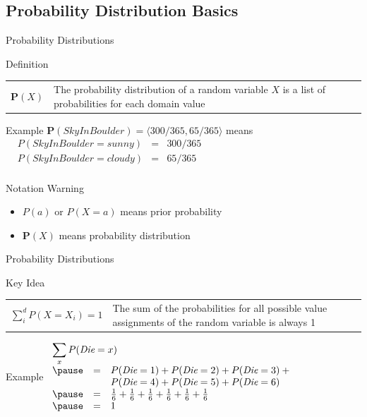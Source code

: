 \documentclass[14pt]{beamer}
\begin{document}
\subsection{Probability Distribution Basics}
\begin{frame}{Probability Distributions}
	\begin{block}{Definition}
		\begin{tabular}{lm{3.5in}@{}}
			\large $\mathbf{P}(X)$
			&
			The \alert{probability distribution} of a random variable $X$ is a list of probabilities for each domain value
		\end{tabular}
	\end{block}
	\pause
	\begin{block}{Example}
		$\mathbf{P}(\textit{SkyInBoulder}) = \langle 300/365, 65/365 \rangle$ means \\[.25em]
		$
		\begin{array}{llll}
			& P(\textit{SkyInBoulder}=\textit{sunny})  & = & 300/365 \\
			& P(\textit{SkyInBoulder}=\textit{cloudy}) & = & 65/365 \\
		\end{array}
		$
	\end{block}
	\pause
	\begin{block}{Notation Warning}
		\begin{itemize}
			\item $P(a)$ or $P(X=a)$ means prior probability
			\item $\mathbf{P}(X)$ means probability distribution
		\end{itemize}
	\end{block}
\end{frame}
\begin{frame}{Probability Distributions}
	\begin{block}{Key Idea}
		\begin{tabular}{lm{2.4in}@{}}
			\large $\sum\limits^{d}_{i}{P(X=X_{i})} = 1$
			&
			The sum of the probabilities for all possible value assignments of the random variable is always 1
		\end{tabular}
	\end{block}
	\pause
	\begin{block}{Example}
		$
		\begin{array}{lll}
			\lefteqn{\sum\limits_{x}{P(\textit{Die}=x)}} \\
			\pause
			& = & P(\textit{Die}=1) + P(\textit{Die}=2) + P(\textit{Die}=3) + \mbox{}\\
			&   & P(\textit{Die}=4) + P(\textit{Die}=5) + P(\textit{Die}=6) \\
			\pause
			& = & \frac{1}{6} + \frac{1}{6} + \frac{1}{6} + \frac{1}{6} + \frac{1}{6} + \frac{1}{6} \\
			\pause
			& = & 1
		\end{array}
		$
	\end{block}
\end{frame}
\end{document}
